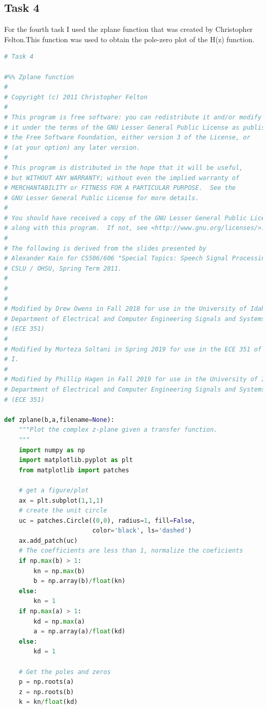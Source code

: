 \documentclass[12pt]{report}
\begin{document}
\subsection{Task 4}
For the fourth task I used the zplane function that was created by
Christopher Felton.This function was used to obtain the pole-zero plot
of the H(z) function.
\begin{lstlisting}[language=Python]
# Task 4

#%% Zplane function
#
# Copyright (c) 2011 Christopher Felton
#
# This program is free software: you can redistribute it and/or modify
# it under the terms of the GNU Lesser General Public License as published by
# the Free Software Foundation, either version 3 of the License, or
# (at your option) any later version.
#
# This program is distributed in the hope that it will be useful,
# but WITHOUT ANY WARRANTY; without even the implied warranty of
# MERCHANTABILITY or FITNESS FOR A PARTICULAR PURPOSE.  See the
# GNU Lesser General Public License for more details.
#
# You should have received a copy of the GNU Lesser General Public License
# along with this program.  If not, see <http://www.gnu.org/licenses/>.
#
# The following is derived from the slides presented by
# Alexander Kain for CS506/606 "Special Topics: Speech Signal Processing"
# CSLU / OHSU, Spring Term 2011.
#
#
#
# Modified by Drew Owens in Fall 2018 for use in the University of Idaho's 
# Department of Electrical and Computer Engineering Signals and Systems I Lab
# (ECE 351)
#
# Modified by Morteza Soltani in Spring 2019 for use in the ECE 351 of the U of
# I.
#
# Modified by Phillip Hagen in Fall 2019 for use in the University of Idaho's  
# Department of Electrical and Computer Engineering Signals and Systems I Lab 
# (ECE 351)
    
def zplane(b,a,filename=None):
    """Plot the complex z-plane given a transfer function.
    """
    import numpy as np
    import matplotlib.pyplot as plt
    from matplotlib import patches    
    
    # get a figure/plot
    ax = plt.subplot(1,1,1)
    # create the unit circle
    uc = patches.Circle((0,0), radius=1, fill=False,
                        color='black', ls='dashed')
    ax.add_patch(uc)
    # The coefficients are less than 1, normalize the coeficients
    if np.max(b) > 1:
        kn = np.max(b)
        b = np.array(b)/float(kn)
    else:
        kn = 1
    if np.max(a) > 1:
        kd = np.max(a)
        a = np.array(a)/float(kd)
    else:
        kd = 1
        
    # Get the poles and zeros
    p = np.roots(a)
    z = np.roots(b)
    k = kn/float(kd)
    

\end{lstlisting}
\end{document}
